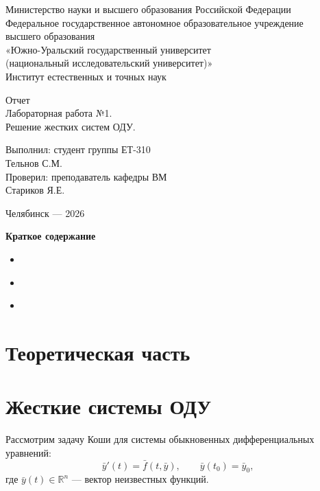 ﻿\documentclass[a4paper]{article}
\newcommand{\mainsection}[1]{%
    \phantomsection
    \section*{\centering\fontsize{16pt}{0pt}\selectfont\textbf{#1}}%
}
\newcommand{\subsectiontext}[1]{%
    \section*{\fontsize{13pt}{0pt}\selectfont\textbf{#1}}%
}
\begin{document}
\centering
Министерство науки и высшего образования Российской Федерации\\
Федеральное государственное автономное образовательное учреждение\\
высшего образования\\
«Южно-Уральский государственный университет\\
(национальный исследовательский университет)»\\
Институт естественных и точных наук

\setlength{\parskip}{7.5cm}

Отчет\\
Лабораторная работа №1.\\
Решение жестких систем ОДУ.

\setlength{\parskip}{5.9cm}

\raggedleft
\begin{minipage}{0.46\textwidth}
\raggedright
Выполнил: студент группы ЕТ-310\\
Тельнов С.М.\\
Проверил: преподаватель кафедры ВМ\\
Стариков Я.Е.
\end{minipage}

\setlength{\parskip}{5.9cm}

\centering
Челябинск — 2026

\setlength{\parskip}{0pt plus 1pt}
\newpage

\centering
\textbf{Краткое содержание}
\begin{itemize}
    \setlength{\parskip}{0.4cm}
    \item \hyperref[sec:theory]{ \dotfill \pageref{sec:theory}}
    \item \hyperref[sec:practice]{ \dotfill \pageref{sec:practice}}
    \item \hyperref[sec:conclusion]{ \dotfill \pageref{sec:conclusion}}
\end{itemize}
\newpage

\setlength{\parindent}{1.5em}

\raggedright

\label{sec:theory}
\mainsection{Теоретическая часть}

\subsectiontext{Жесткие системы ОДУ}

Рассмотрим задачу Коши для системы обыкновенных дифференциальных уравнений:
\begin{equation*}
    \bar{y}'(t) = \bar{f}(t, \bar{y}), \qquad \bar{y}(t_0) = \bar{y}_0,
\end{equation*}
где $\bar{y}(t) \in \mathbb{R}^n$ --- вектор неизвестных функций.
\end{document}
